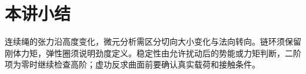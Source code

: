 \section{本讲小结}
连续绳的张力沿高度变化，微元分析需区分切向大小变化与法向转向。链环须保留刚体力矩，弹性圈须说明劲度定义。稳定性由允许扰动后的势能或力矩判断，二阶项为零时继续检查高阶；虚功反求曲面前要确认真实载荷和接触条件。
